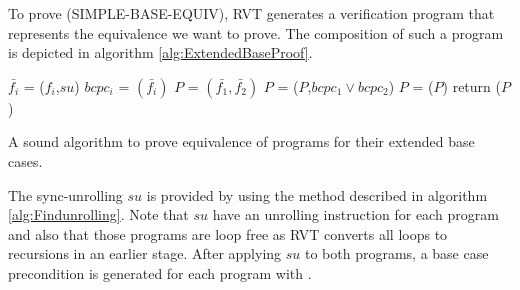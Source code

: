 To prove (SIMPLE-BASE-EQUIV), RVT generates a verification program that represents the equivalence we want to prove. The composition of such a program is depicted in algorithm  \ref{alg:ExtendedBaseProof}.

\noindent
\begin{algorithm}
\begin{minipage}{\linewidth}
\begin{algorithmic}[1]
    \label{step:foreach_p}
	\State$\bar{f_i}$ = ($f_i$,$su$)
	\State $bcpc_i$ = $(\bar{f_i})$
	\EndFor
	\State $P$ = $(\bar{f_1},\bar{f_2})$
    \State $P$ = ($P$,$bcpc_1 \lor bcpc_2$) \label{step:assumebcpc12}
    \State $P$ = ($P$)
    \State return ($P$)
	\EndFunction
\end{algorithmic}
\end{minipage}
\caption{A sound algorithm to prove equivalence of programs for their extended base cases.}
\label{alg:ExtendedBaseProof}
\end{algorithm}
The sync-unrolling $su$ is provided by using the method described in algorithm \ref{alg:Findunrolling}. Note that $su$ have an unrolling instruction for each program and also that those programs are loop free as RVT converts all loops to recursions in an earlier stage. After applying $su$ to both programs, a base case precondition is generated for each program with .

